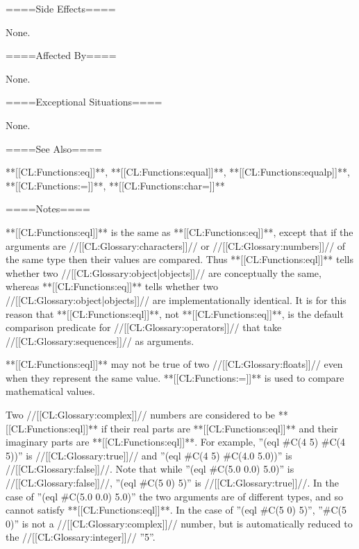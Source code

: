 ====Side Effects====

None.

====Affected By====

None.

====Exceptional Situations====

None.

====See Also====

**[[CL:Functions:eq]]**, **[[CL:Functions:equal]]**, **[[CL:Functions:equalp]]**, **[[CL:Functions:=]]**, **[[CL:Functions:char=]]**

====Notes====

**[[CL:Functions:eql]]** is the same as **[[CL:Functions:eq]]**, except that if the arguments are //[[CL:Glossary:characters]]// or //[[CL:Glossary:numbers]]// of the same type then their values are compared. Thus **[[CL:Functions:eql]]** tells whether two //[[CL:Glossary:object|objects]]// are conceptually the same, whereas **[[CL:Functions:eq]]** tells whether two //[[CL:Glossary:object|objects]]// are implementationally identical. It is for this reason that **[[CL:Functions:eql]]**, not **[[CL:Functions:eq]]**, is the default comparison predicate for //[[CL:Glossary:operators]]// that take //[[CL:Glossary:sequences]]// as arguments.

**[[CL:Functions:eql]]** may not be true of two //[[CL:Glossary:floats]]// even when they represent the same value. **[[CL:Functions:=]]** is used to compare mathematical values.

Two //[[CL:Glossary:complex]]// numbers are considered to be **[[CL:Functions:eql]]** if their real parts are **[[CL:Functions:eql]]** and their imaginary parts are **[[CL:Functions:eql]]**. For example, ''(eql #C(4 5) #C(4 5))'' is //[[CL:Glossary:true]]// and ''(eql #C(4 5) #C(4.0 5.0))'' is //[[CL:Glossary:false]]//. Note that while ''(eql #C(5.0 0.0) 5.0)'' is //[[CL:Glossary:false]]//, ''(eql #C(5 0) 5)'' is //[[CL:Glossary:true]]//. In the case of ''(eql #C(5.0 0.0) 5.0)'' the two arguments are of different types, and so cannot satisfy **[[CL:Functions:eql]]**. In the case of ''(eql #C(5 0) 5)'', ''#C(5 0)'' is not a //[[CL:Glossary:complex]]// number, but is automatically reduced to the //[[CL:Glossary:integer]]// ''5''.

